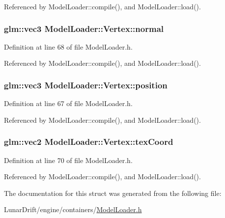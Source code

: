 Referenced by Model\+Loader\+::compile(), and Model\+Loader\+::load().

\subsubsection[{\texorpdfstring{normal}{normal}}]{\setlength{\rightskip}{0pt plus 5cm}glm\+::vec3 Model\+Loader\+::\+Vertex\+::normal}\hypertarget{struct_model_loader_1_1_vertex_a0d1ac4c30a3a1e4645ea14332d86b035}{}\label{struct_model_loader_1_1_vertex_a0d1ac4c30a3a1e4645ea14332d86b035}


Definition at line 68 of file Model\+Loader.\+h.



Referenced by Model\+Loader\+::compile(), and Model\+Loader\+::load().

\subsubsection[{\texorpdfstring{position}{position}}]{\setlength{\rightskip}{0pt plus 5cm}glm\+::vec3 Model\+Loader\+::\+Vertex\+::position}\hypertarget{struct_model_loader_1_1_vertex_a78385e6b324c9f786e7f4e14263ca026}{}\label{struct_model_loader_1_1_vertex_a78385e6b324c9f786e7f4e14263ca026}


Definition at line 67 of file Model\+Loader.\+h.



Referenced by Model\+Loader\+::compile(), and Model\+Loader\+::load().

\subsubsection[{\texorpdfstring{tex\+Coord}{texCoord}}]{\setlength{\rightskip}{0pt plus 5cm}glm\+::vec2 Model\+Loader\+::\+Vertex\+::tex\+Coord}\hypertarget{struct_model_loader_1_1_vertex_a8821e887b456902f93bf0e16f58a72db}{}\label{struct_model_loader_1_1_vertex_a8821e887b456902f93bf0e16f58a72db}


Definition at line 70 of file Model\+Loader.\+h.



Referenced by Model\+Loader\+::compile(), and Model\+Loader\+::load().



The documentation for this struct was generated from the following file\+:\begin{DoxyCompactItemize}
\item 
Lunar\+Drift/engine/containers/\hyperlink{_model_loader_8h}{Model\+Loader.\+h}\end{DoxyCompactItemize}

